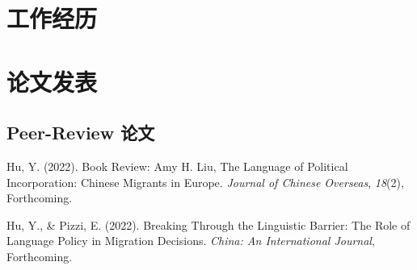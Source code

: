 \documentclass[11pt,a4paper,]{awesome-cv}
\begin{document}
\hypertarget{ux5de5ux4f5cux7ecfux5386}{%
\section{工作经历}\label{ux5de5ux4f5cux7ecfux5386}}

\begin{cventries}
    \vspace{-4.0mm}
    \vspace{-4.0mm}
    \vspace{-4.0mm}
    \vspace{-4.0mm}
    \vspace{-4.0mm}
    \vspace{-4.0mm}
    \vspace{-4.0mm}
\end{cventries}

\hypertarget{ux8bbaux6587ux53d1ux8868}{%
\section{论文发表}\label{ux8bbaux6587ux53d1ux8868}}

\hypertarget{peer-review-ux8bbaux6587}{%
\subsection{\texorpdfstring{\textbf{Peer-Review
论文}}{Peer-Review 论文}}\label{peer-review-ux8bbaux6587}}

\begingroup
\setlength{\parindent}{-0.5in}
\setlength{\leftskip}{0.5in}

\hypertarget{bibliography}{}
\leavevmode{}%
Hu, Y. (2022). Book Review: Amy H. Liu, The Language of Political
Incorporation: Chinese Migrants in Europe. \emph{Journal of Chinese
Overseas}, \emph{18}(2), Forthcoming.

\leavevmode{}%
Hu, Y., \& Pizzi, E. (2022). Breaking Through the Linguistic Barrier:
The Role of Language Policy in Migration Decisions. \emph{China: An
International Journal}, Forthcoming.
\end{document}
